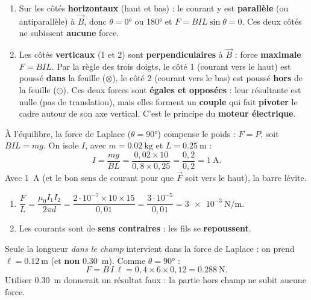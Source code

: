 \documentclass[11pt,a4paper]{article}
\newcommand{\vv}[1]{\vec{#1}}\newcommand{\ds}{\displaystyle}
\begin{document}
\begin{corrige}
\begin{enumerate}[label=\alph*)]
  \item Sur les côtés \textbf{horizontaux} (haut et bas) : le courant y est \textbf{parallèle} (ou
        antiparallèle) à $\vv{B}$, donc $\theta=\ang{0}$ ou \ang{180} et $F=BIL\sin\theta=0$.
        Ces deux côtés ne subissent \textbf{aucune} force.
  \item Les côtés \textbf{verticaux} (1 et 2) sont \textbf{perpendiculaires} à $\vv{B}$ : force
        \textbf{maximale} $F=BIL$. Par la règle des trois doigts, le côté 1 (courant vers le haut) est
        poussé \textbf{dans} la feuille ($\otimes$), le côté 2 (courant vers le bas) est poussé
        \textbf{hors} de la feuille ($\odot$). Ces deux forces sont \textbf{égales et opposées} : leur
        résultante est nulle (pas de translation), mais elles forment un \textbf{couple} qui fait
        \textbf{pivoter} le cadre autour de son axe vertical. C'est le principe du \textbf{moteur
        électrique}.
\end{enumerate}
\end{corrige}

\begin{corrige}
À l'équilibre, la force de Laplace ($\theta=\ang{90}$) compense le poids : $F=P$, soit $BIL=mg$.
On isole $I$, avec $m=\qty{0.02}{\kilogram}$ et $L=\qty{0.25}{\metre}$ :
\[ I=\frac{mg}{BL}=\frac{0{,}02\times10}{0{,}8\times0{,}25}=\frac{0{,}2}{0{,}2}=\qty{1}{\ampere}. \]
Avec \qty{1}{\ampere} (et le bon sens de courant pour que $\vv{F}$ soit vers le haut), la barre lévite.
\end{corrige}

\begin{corrige}
\begin{enumerate}[label=\alph*)]
  \item $\dfrac{F}{L}=\dfrac{\mu_0 I_1 I_2}{2\pi d}=\dfrac{2\cdot10^{-7}\times10\times15}{0{,}01}
        =\dfrac{3\cdot10^{-5}}{0{,}01}=\qty{3e-3}{\newton\per\metre}.$
  \item Les courants sont de \textbf{sens contraires} : les fils se \textbf{repoussent}.
\end{enumerate}
\end{corrige}

\begin{corrige}
Seule la longueur \emph{dans le champ} intervient dans la force de Laplace : on prend
$\ell=\qty{0.12}{\metre}$ (et \textbf{non} \qty{0.30}{\metre}). Comme $\theta=\ang{90}$ :
\[ F=B\,I\,\ell=0{,}4\times6\times0{,}12=\qty{0.288}{\newton}. \]
Utiliser \qty{0.30}{\metre} donnerait un résultat faux : la partie hors champ ne subit aucune force.
\end{corrige}
\end{document}
